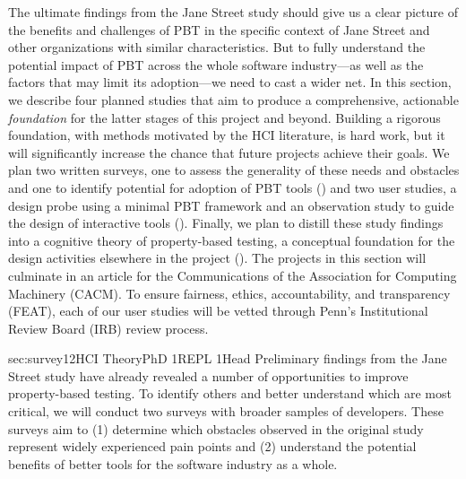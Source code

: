 

The ultimate findings from the Jane Street study should
give us a clear
picture of the benefits and challenges of PBT in the specific context
of Jane Street and other organizations with similar characteristics.  But to
fully understand the potential impact of PBT across the whole software
industry---as well as the factors that may limit its adoption---we need to
cast a wider net.
%
In this section, we describe four planned studies that aim
to produce a comprehensive, actionable
{\em foundation} for the latter stages of this project and beyond. Building a
rigorous foundation, with methods motivated by the HCI literature, is hard work,
but it will significantly increase the chance that future projects achieve their goals.
We plan two
written surveys, one to assess the generality of these needs and obstacles
and one to identify potential for adoption of PBT tools
() and two user studies, a design probe using a minimal
PBT framework
and an observation study
to guide the design of
interactive tools
(). Finally, we plan to distill these
study findings into a cognitive
theory of property-based testing, a conceptual foundation for the
design activities elsewhere in the project ().
The projects in this section will culminate in an article for the Communications
of the Association for Computing Machinery (CACM).
%
To ensure fairness, ethics, accountability, and transparency (FEAT),
each of our user studies will be vetted through Penn's Institutional
Review Board (IRB) review process.

%
   {sec:survey}{1}{2}{HCI Theory}{PhD 1}{REPL 1}{Head}
%
Preliminary findings from the Jane Street study have already revealed
a number of
opportunities to improve property-based testing. To identify
others and better understand which are most
critical, we will conduct two
surveys with broader samples of developers. These surveys aim to
(1) determine which obstacles observed in the original
study
represent widely experienced pain points and
(2) understand the potential benefits of better tools for the
software industry as a whole.


